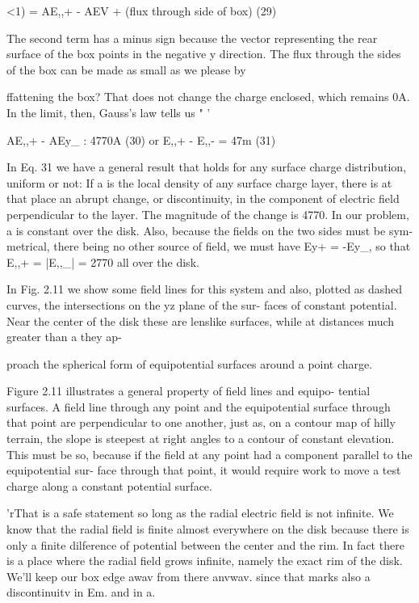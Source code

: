 <1) = AE,,+ - AEV + (flux through side of box) (29)

The second term has a minus sign because the vector representing the
rear surface of the box points in the negative y direction. The flux
through the sides of the box can be made as small as we please by

ffattening the box? That does not change the charge enclosed, which
remains 0A. In the limit, then, Gauss's law tells us " '

AE,,+ - AEy_ : 4770A (30)
or
E,,+ - E,,- = 47m (31)

In Eq. 31 we have a general result that holds for any surface charge
distribution, uniform or not: If a is the local density of any surface
charge layer, there is at that place an abrupt change, or discontinuity,
in the component of electric field perpendicular to the layer. The
magnitude of the change is 4770. In our problem, a is constant over
the disk. Also, because the fields on the two sides must be sym-
metrical, there being no other source of field, we must have
Ey+ = -Ey_, so that E,,+ = |E,,_| = 2770 all over the disk.

In Fig. 2.11 we show some field lines for this system and also,
plotted as dashed curves, the intersections on the yz plane of the sur-
faces of constant potential. Near the center of the disk these are
lenslike surfaces, while at distances much greater than a they ap-

proach the spherical form of equipotential surfaces around a point
charge.

Figure 2.11 illustrates a general property of field lines and equipo-
tential surfaces. A field line through any point and the equipotential
surface through that point are perpendicular to one another, just as,
on a contour map of hilly terrain, the slope is steepest at right angles
to a contour of constant elevation. This must be so, because if the
field at any point had a component parallel to the equipotential sur-
face through that point, it would require work to move a test charge
along a constant potential surface.

'rThat is a safe statement so long as the radial electric field is not infinite. We know
that the radial field is finite almost everywhere on the disk because there is only a finite
dilference of potential between the center and the rim. In fact there is a place where
the radial field grows infinite, namely the exact rim of the disk. We'll keep our box
edge awav from there anvwav. since that marks also a discontinuitv in Em. and in a.

